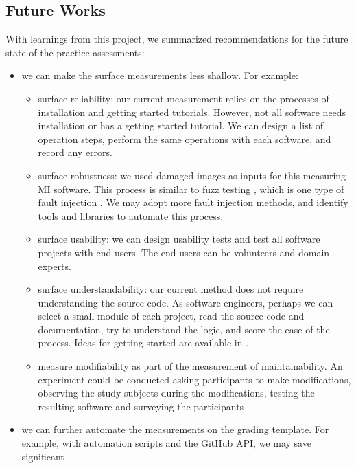 \documentclass[final, 3p, times, authoryear]{elsarticle}
\begin{document}
\subsection{Future Works}

With learnings from this project, we summarized recommendations for the future
state of the practice assessments:
\begin{itemize}
    \item we can make the surface measurements less shallow. For example:
    \begin{itemize}
        \item surface reliability: our current measurement relies on
        the processes of installation and getting started tutorials. However,
        not all software needs installation or has a getting started tutorial.
        We can design a list of operation steps, perform the same operations
        with each software, and record any errors.
        \item surface robustness: we used damaged images as inputs for
        this measuring MI software. This process is similar to fuzz testing
        \citep{enwiki:1039424308}, which is one type of fault injection
        \citep{enwiki:1039005082}. We may adopt more fault injection methods, and
        identify tools and libraries to automate this process.
        \item surface usability: we can design usability tests and test
        all software projects with end-users. The end-users can be volunteers
        and domain experts.
        \item surface understandability: our current method does not
        require understanding the source code. As software engineers, perhaps we
        can select a small module of each project, read the source code and
        documentation, try to understand the logic, and score the ease of the
        process.  Ideas for getting started are available in \citet{SmithEtAl2021}.
        \item measure modifiability as part of the measurement of
        maintainability.  An experiment could be conducted asking participants
        to make modifications, observing the study subjects during the
        modifications, testing the resulting software and surveying the
        participants \citep{SmithEtAl2021}.
    \end{itemize}
	\item we can further automate the measurements on the grading template. For
	example, with automation scripts and the GitHub API, we may save significant

\end{itemize}
\end{document}
